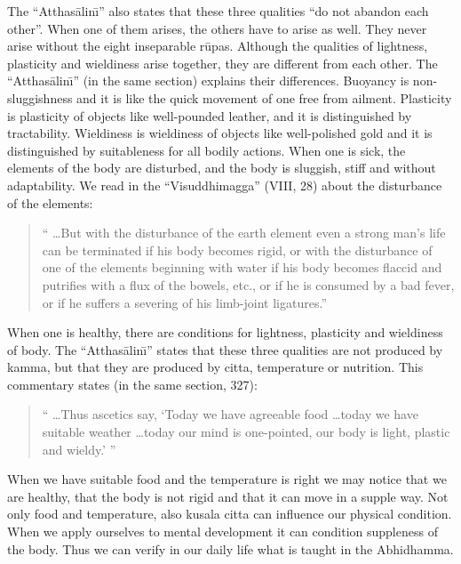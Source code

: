 \documentclass{book}
\begin{document}
The ``Atthas{\=a}lin\=\i'' also states that these three qualities ``do
not abandon each other''. When one of them arises, the others have to
arise as well. They never arise without the eight inseparable r\=upas.
Although the qualities of lightness, plasticity and wieldiness arise
together, they are different from each other. The ``Atthas{\=a}lin\=\i''
(in the same section) explains their differences. Buoyancy is
non-sluggishness and it is like the quick movement of one free from
ailment. Plasticity is plasticity of objects like well-pounded
leather, and it is distinguished by tractability. Wieldiness is
wieldiness of objects like well-polished gold and it is distinguished
by suitableness for all bodily actions. When one is sick, the elements
of the body are disturbed, and the body is sluggish, stiff and without
adaptability. We read in the ``Visuddhimagga'' (VIII, 28) about the
disturbance of the elements:




\begin{quote}\begin{flushleft}
`` \ldots But with the disturbance of the earth element even a strong man's
life can be terminated if his body becomes rigid, or with the
disturbance of one of the elements beginning with water if his body
becomes flaccid and putrifies with a flux of the bowels, etc., or if he
is consumed by a bad fever, or if he suffers a severing of his
limb-joint ligatures.''
\end{flushleft}\end{quote}




When one is healthy, there are conditions for lightness, plasticity and
wieldiness of body. The ``Atthas{\=a}lin\=\i'' states that these three
qualities are not produced by kamma, but that they are produced by
citta, temperature or nutrition. This commentary states (in the same
section, 327):




\begin{quote}\begin{flushleft}
`` \ldots Thus ascetics say, `Today we have agreeable food \ldots today we have
suitable weather \ldots today our mind is one-pointed, our body is light,
plastic and wieldy.' ''

\end{flushleft}\end{quote}



When we have suitable food and the temperature is right we may notice
that we are healthy, that the body is not rigid and that it can move in
a supple way. Not only food and temperature, also kusala citta can
influence our physical condition. When we apply ourselves to mental
development it can condition suppleness of the body. Thus we can verify
in our daily life what is taught in the Abhidhamma. 
\end{document}
